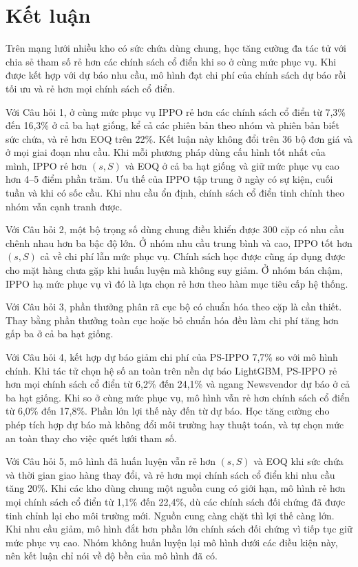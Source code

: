 \section{Kết luận}
\label{subsec:traLoiCauHoi}

Trên mạng lưới nhiều kho có sức chứa dùng chung, học tăng cường đa tác tử với chia sẻ tham số rẻ hơn các chính sách cổ điển khi so ở cùng mức phục vụ. Khi được kết hợp với dự báo nhu cầu, mô hình đạt chi phí của chính sách dự báo rồi tối ưu và rẻ hơn mọi chính sách cổ điển.

Với Câu hỏi 1, ở cùng mức phục vụ IPPO rẻ hơn các chính sách cổ điển từ 7,3\% đến 16,3\% ở cả ba hạt giống, kể cả các phiên bản theo nhóm và phiên bản biết sức chứa, và rẻ hơn EOQ trên 22\%. Kết luận này không đổi trên 36 bộ đơn giá và ở mọi giai đoạn nhu cầu. Khi mỗi phương pháp dùng cấu hình tốt nhất của mình, IPPO rẻ hơn $(s, S)$ và EOQ ở cả ba hạt giống và giữ mức phục vụ cao hơn 4--5 điểm phần trăm. Ưu thế của IPPO tập trung ở ngày có sự kiện, cuối tuần và khi có sốc cầu. Khi nhu cầu ổn định, chính sách cổ điển tinh chỉnh theo nhóm vẫn cạnh tranh được.

Với Câu hỏi 2, một bộ trọng số dùng chung điều khiển được 300 cặp có nhu cầu chênh nhau hơn ba bậc độ lớn. Ở nhóm nhu cầu trung bình và cao, IPPO tốt hơn $(s, S)$ cả về chi phí lẫn mức phục vụ. Chính sách học được cũng áp dụng được cho mặt hàng chưa gặp khi huấn luyện mà không suy giảm. Ở nhóm bán chậm, IPPO hạ mức phục vụ vì đó là lựa chọn rẻ hơn theo hàm mục tiêu cấp hệ thống.

Với Câu hỏi 3, phần thưởng phân rã cục bộ có chuẩn hóa theo cặp là cần thiết. Thay bằng phần thưởng toàn cục hoặc bỏ chuẩn hóa đều làm chi phí tăng hơn gấp ba ở cả ba hạt giống.

Với Câu hỏi 4, kết hợp dự báo giảm chi phí của PS-IPPO 7,7\% so với mô hình chính. Khi tác tử chọn hệ số an toàn trên nền dự báo LightGBM, PS-IPPO rẻ hơn mọi chính sách cổ điển từ 6,2\% đến 24,1\% và ngang Newsvendor dự báo ở cả ba hạt giống. Khi so ở cùng mức phục vụ, mô hình vẫn rẻ hơn chính sách cổ điển từ 6,0\% đến 17,8\%. Phần lớn lợi thế này đến từ dự báo. Học tăng cường cho phép tích hợp dự báo mà không đổi môi trường hay thuật toán, và tự chọn mức an toàn thay cho việc quét lưới tham số.

Với Câu hỏi 5, mô hình đã huấn luyện vẫn rẻ hơn $(s, S)$ và EOQ khi sức chứa và thời gian giao hàng thay đổi, và rẻ hơn mọi chính sách cổ điển khi nhu cầu tăng 20\%. Khi các kho dùng chung một nguồn cung có giới hạn, mô hình rẻ hơn mọi chính sách cổ điển từ 1,1\% đến 22,4\%, dù các chính sách đối chứng đã được tinh chỉnh lại cho môi trường mới. Nguồn cung càng chặt thì lợi thế càng lớn. Khi nhu cầu giảm, mô hình đắt hơn phần lớn chính sách đối chứng vì tiếp tục giữ mức phục vụ cao. Nhóm không huấn luyện lại mô hình dưới các điều kiện này, nên kết luận chỉ nói về độ bền của mô hình đã có.

